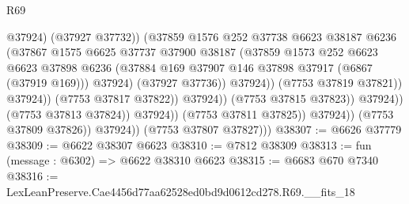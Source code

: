 \begin{lexlean}{R69}
\begin{coremodule}
{                                                  @37924)
                                                (@37927 @37732))
                                              (@37859
                                                @1576
                                                @252
                                                @37738
                                                @6623
                                                @38187
                                                @6236
                                                (@37867
                                                  @1575
                                                  @6625
                                                  @37737
                                                  @37900
                                                  @38187
                                                  (@37859
                                                    @1573
                                                    @252
                                                    @6623
                                                    @6623
                                                    @37898
                                                    @6236
                                                    (@37884
                                                      @169
                                                      @37907
                                                      @146
                                                      @37898
                                                      @37917
                                                      (@6867 (@37919 @169)))
                                                    @37924)
                                                  (@37927 @37736))
                                                @37924))
                                            (@7753 @37819 @37821))
                                          @37924))
                                      (@7753 @37817 @37822))
                                    @37924))
                                (@7753 @37815 @37823))
                              @37924))
                          (@7753 @37813 @37824))
                        @37924))
                    (@7753 @37811 @37825))
                  @37924))
              (@7753 @37809 @37826))
            @37924))
        (@7753 @37807 @37827)))
@38307 := @6626 @37779
@38309 := @6622 @38307 @6623
@38310 := @7812 @38309
@38313 := fun (message : @6302) => @6622 @38310 @6623
@38315 := @6683 @670 @7340
@38316 := LexLeanPreserve.Cae4456d77aa62528ed0bd9d0612cd278.R69.__fits_18
}
\end{coremodule}
\end{lexlean}
